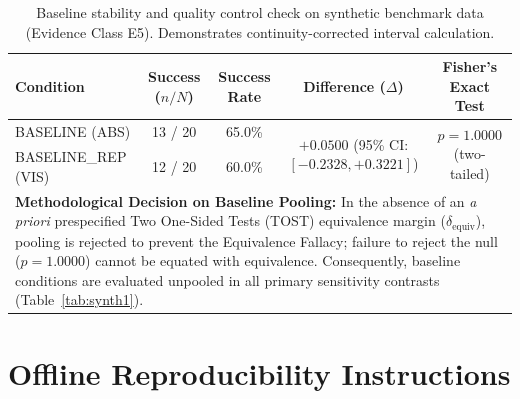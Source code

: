 \documentclass[conference]{IEEEtran}
\begin{document}
\begin{table}[ht]
\centering
\small
\caption{Baseline stability and quality control check on synthetic benchmark data (Evidence Class E5). Demonstrates continuity-corrected interval calculation.}
\label{tab:synth2}
\begin{tabular*}{\textwidth}{@{\extracolsep{\fill}}lcccc@{}}
\toprule
\textbf{Condition} & \textbf{Success ($n/N$)} & \textbf{Success Rate} & \textbf{Difference ($\Delta$)} & \textbf{Fisher's Exact Test} \\
\midrule
\textsc{BASELINE (ABS)}     & 13 / 20 & 65.0\% & \multirow{2}{*}{$+0.0500$ (95\% CI: $[-0.2328, +0.3221]$)} & \multirow{2}{*}{$p = 1.0000$ (two-tailed)} \\
\textsc{BASELINE\_REP (VIS)} & 12 / 20 & 60.0\% & & \\
\midrule
\multicolumn{5}{p{\dimexpr\textwidth-2\tabcolsep\relax}}{\textbf{Methodological Decision on Baseline Pooling:} In the absence of an \textit{a priori} prespecified Two One-Sided Tests (TOST) equivalence margin ($\delta_{\text{equiv}}$), pooling is rejected to prevent the Equivalence Fallacy; failure to reject the null ($p = 1.0000$) cannot be equated with equivalence. Consequently, baseline conditions are evaluated unpooled in all primary sensitivity contrasts (Table~\ref{tab:synth1}).} \\
\bottomrule
\end{tabular*}
\end{table}

\FloatBarrier

\section{Offline Reproducibility Instructions}
\label{app:reproduce}
\end{document}
